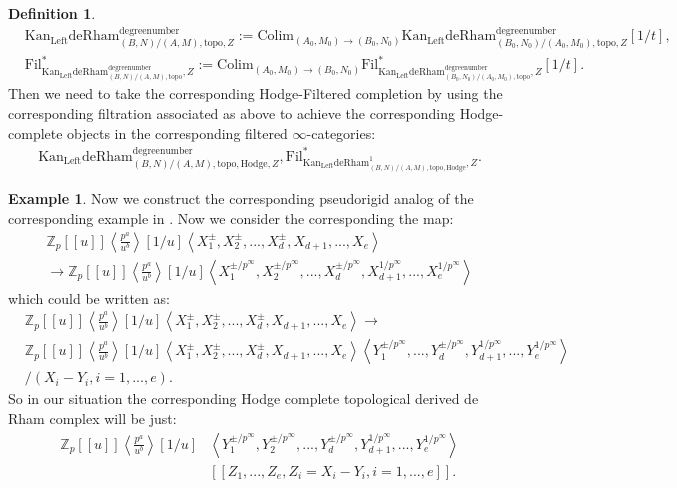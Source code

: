 \documentclass[11pt]{book}
\theoremstyle{definition}
\newtheorem{definition}[theorem]{Definition}
\numberwithin{equation}{section}
\newtheorem{example}[theorem]{Example}
\begin{document}
\begin{definition}
\begin{align}
&\mathrm{Kan}_\mathrm{Left}\mathrm{deRham}^\text{degreenumber}_{(B,N)/(A,M),\mathrm{topo},Z}:=\mathrm{Colim}_{(A_0,M_0)\rightarrow (B_0,N_0)}\mathrm{Kan}_\mathrm{Left}\mathrm{deRham}^\text{degreenumber}_{(B_0,N_0)/(A_0,M_0),\mathrm{topo},Z}[1/t],\\
&\mathrm{Fil}^*_{\mathrm{Kan}_\mathrm{Left}\mathrm{deRham}^\text{degreenumber}_{(B,N)/(A,M),\mathrm{topo}},Z}:=\mathrm{Colim}_{(A_0,M_0)\rightarrow (B_0,N_0)}\mathrm{Fil}^*_{\mathrm{Kan}_\mathrm{Left}\mathrm{deRham}^\text{degreenumber}_{(B_0,N_0)/(A_0,M_0),\mathrm{topo}},Z}[1/t].
\end{align}
Then we need to take the corresponding Hodge-Filtered completion by using the corresponding filtration associated as above to achieve the corresponding Hodge-complete objects in the corresponding filtered $\infty$-categories:
\begin{align}
{\mathrm{Kan}_\mathrm{Left}\mathrm{deRham}}^\text{degreenumber}_{(B,N)/(A,M),\mathrm{topo,Hodge},Z},\mathrm{Fil}^*_{{\mathrm{Kan}_\mathrm{Left}\mathrm{deRham}}^1_{(B,N)/(A,M),\mathrm{topo,Hodge}},Z}.	
\end{align} 	
\end{definition}


\begin{example}
Now we construct the corresponding pseudorigid analog of the corresponding example in \cite[Example 4.7]{12GL}. Now we consider the corresponding the map:
\begin{align}
\mathbb{Z}_p[[u]]\left<\frac{p^a}{u^b}\right>[1/u]\left<X^\pm_1,X^\pm_2,...,X^\pm_d,X_{d+1},...,X_e\right>\\
\longrightarrow \mathbb{Z}_p[[u]]\left<\frac{p^a}{u^b}\right>[1/u]\left<X^{\pm/p^\infty}_1,X^{\pm/p^\infty}_2,...,X^{\pm/p^\infty}_d,X^{1/p^\infty}_{d+1},...,X^{1/p^\infty}_e\right>	
\end{align}
which could be written as:	
\begin{align}
&\mathbb{Z}_p[[u]]\left<\frac{p^a}{u^b}\right>[1/u]\left<X^\pm_1,X^\pm_2,...,X^\pm_d,X_{d+1},...,X_e\right>\longrightarrow \\
&\mathbb{Z}_p[[u]]\left<\frac{p^a}{u^b}\right>[1/u]\left<X^\pm_1,X^\pm_2,...,X^\pm_d,X_{d+1},...,X_e\right>\left<Y^{\pm/p^\infty}_1,...,Y^{\pm/p^\infty}_d,Y^{1/p^\infty}_{d+1},...,Y^{1/p^\infty}_e\right>\\
&/(X_i-Y_i,i=1,...,e).		
\end{align}
So in our situation the corresponding Hodge complete topological derived de Rham complex will be just:
\begin{align}
\mathbb{Z}_p[[u]]\left<\frac{p^a}{u^b}\right>[1/u]&\left<Y^{\pm/p^\infty}_1,Y^{\pm/p^\infty}_2,...,Y^{\pm/p^\infty}_d,Y^{1/p^\infty}_{d+1},...,Y^{1/p^\infty}_e\right>\\
&[[Z_1,...,Z_e,Z_i=X_i-Y_i,i=1,...,e]].	
\end{align}

\end{example}
\end{document}
